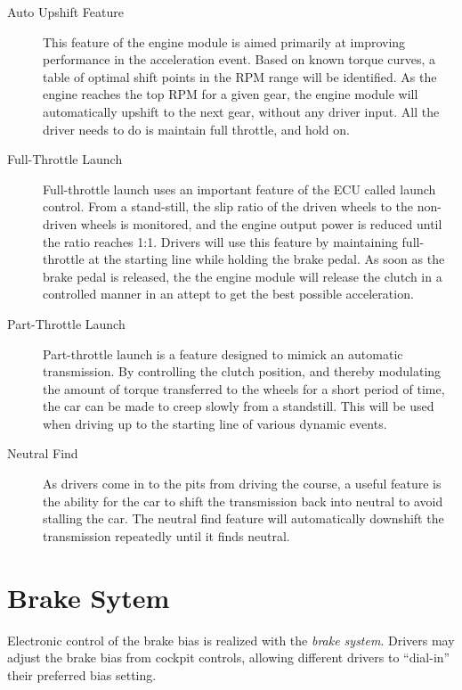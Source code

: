 \begin{description}

\item[Auto Upshift Feature]
This feature of the engine module is aimed primarily at improving performance in the acceleration event. Based on known torque curves, a table of optimal shift points in the RPM range will be identified. As the engine reaches the top RPM for a given gear, the engine module will automatically upshift to the next gear, without any driver input. All the driver needs to do is maintain full throttle, and hold on.

\item[Full-Throttle Launch]
Full-throttle launch uses an important feature of the ECU called launch control. From a stand-still, the slip ratio of the driven wheels to the non-driven wheels is monitored, and the engine output power is reduced until the ratio reaches 1:1. Drivers will use this feature by maintaining full-throttle at the starting line while holding the brake pedal. As soon as the brake pedal is released, the the engine module will release the clutch in a controlled manner in an attept to get the best possible acceleration.

\item[Part-Throttle Launch]
Part-throttle launch is a feature designed to mimick an automatic transmission. By controlling the clutch position, and thereby modulating the amount of torque transferred to the wheels for a short period of time, the car can be made to creep slowly from a standstill. This will be used when driving up to the starting line of various dynamic events.

\item[Neutral Find]
As drivers come in to the pits from driving the course, a useful feature is the ability for the car to shift the transmission back into neutral to avoid stalling the car. The neutral find feature will automatically downshift the transmission repeatedly until it finds neutral.

\end{description}

%
%

\section{Brake Sytem}

Electronic control of the brake bias is realized with the \emph{brake system}. Drivers may adjust the brake bias from cockpit controls, allowing different drivers to {}``dial-in'' their preferred bias setting. 

